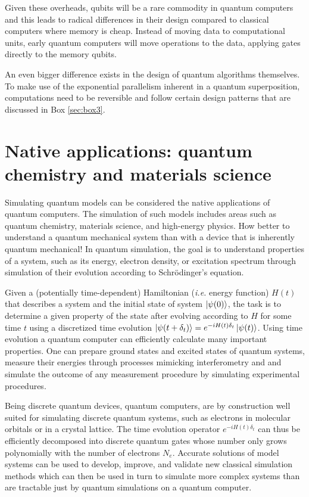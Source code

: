 \documentclass[journal]{IEEEtran}
\begin{document}
Given these overheads, qubits will be a rare commodity in quantum computers and this leads to radical differences in their design compared  to classical computers where memory is cheap. Instead of moving data to computational units, early quantum computers will move operations to the data, applying gates directly to the memory qubits.

 An even bigger difference exists in the design of quantum algorithms themselves. To make use of the  exponential parallelism inherent in a quantum superposition, computations need to be reversible and follow certain design patterns that are discussed in Box \ref{sec:box3}. 







\section{Native applications: quantum chemistry and materials science}

Simulating quantum models can be considered the native applications of quantum computers. The simulation of such models includes areas such as quantum chemistry, materials science, and high-energy physics. How better to understand a quantum mechanical system than with a device that is inherently quantum mechanical! In quantum simulation, the goal is to understand properties of a system, such as its energy, electron density, or excitation spectrum through simulation of their evolution according to Schr\"odinger's equation.  

Given a (potentially time-dependent) Hamiltonian ({\it i.e.} energy function) $H(t)$ that describes a system and the initial state of system $\ket{\psi(0)}$, the task is to determine a given property of the state after evolving according to $H$ for some time $t$ using a discretized time evolution $\ket{\psi(t+\delta_t)}=e^{-iH(t)\delta_t}\ket{\psi(t)}$. Using time evolution a quantum computer can efficiently  calculate many important properties. One can prepare ground states and excited states of quantum systems, measure their energies through processes mimicking interferometry and and simulate the outcome of any measurement procedure by simulating experimental procedures.

Being discrete quantum devices, quantum computers, are by construction well suited for simulating discrete quantum systems, such as electrons in molecular orbitals or in a crystal lattice. The time evolution operator $e^{-iH(t)\delta_t}$ can thus be efficiently decomposed into discrete quantum gates whose number only grows polynomially with the number of electrons $N_e$. Accurate solutions of model systems can be used to develop, improve, and validate new classical simulation methods which can then be used in turn to simulate more complex systems than are tractable just by quantum simulations on a quantum computer. 
\end{document}

